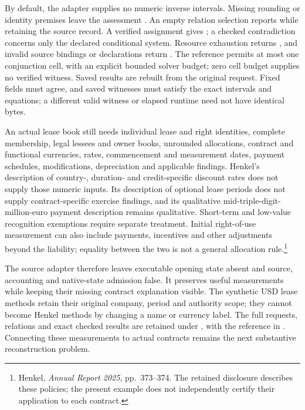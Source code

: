 By default, the adapter supplies no numeric inverse intervals. Missing rounding
or identity premises leave the assessment . An empty relation
selection reports  while retaining the source record.
A verified assignment gives ; a checked
contradiction concerns only the declared conditional system. Resource exhaustion
returns , and invalid source bindings or declarations return
. The reference permits at most one conjunction cell, with an
explicit bounded solver budget; zero cell budget supplies no verified witness.
Saved results are rebuilt from the original request. Fixed fields must agree,
and saved witnesses must satisfy the exact intervals and equations; a different
valid witness or elapsed runtime need not have identical bytes.

An actual lease book still needs individual lease and right identities, complete
membership, legal lessees and owner books, unrounded allocations, contract and
functional currencies, rates, commencement and measurement dates, payment
schedules, modifications, depreciation and applicable findings. Henkel's
description of country-, duration- and credit-specific discount rates does not
supply those numeric inputs. Its description of optional lease periods does
not supply contract-specific exercise findings, and its qualitative
mid-triple-digit-million-euro payment description remains qualitative.
Short-term and low-value recognition exemptions require separate treatment.
Initial right-of-use measurement can also include payments, incentives and
other adjustments beyond the liability; equality between the two is not a
general allocation rule.\footnote{Henkel, \emph{Annual Report 2025},
pp.~373--374. The retained disclosure describes these policies; the present
example does not independently certify their application to each contract.}

The source adapter therefore leaves executable opening state absent and source,
accounting and native-state admission false. It preserves useful measurements
while keeping their missing contract explanation visible. The synthetic USD
lease methods retain their original company, period and authority scope; they
cannot become Henkel methods by changing a name or currency label. The full
requests, relations and exact checked results are retained under
, with the
reference in . Connecting these
measurements to actual contracts remains the next substantive reconstruction
problem.
